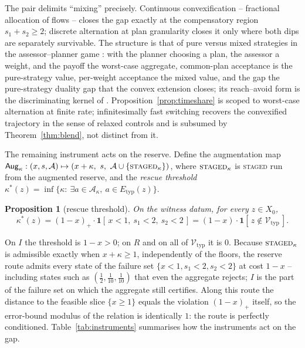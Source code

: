 \documentclass[preprint,11pt,authoryear]{elsarticle}
\newtheorem{proposition}{Proposition}
\theoremstyle{definition}
\theoremstyle{remark}
\newcommand{\Etyp}{E_{\mathrm{typ}}}
\newcommand{\Vtyp}{\mathcal{V}_{\mathrm{typ}}}
\newcommand{\act}[1]{\textsc{#1}}
\begin{document}
The pair delimits ``mixing'' precisely. Continuous convexification -- fractional allocation of flows -- closes the gap exactly at the compensatory region $s_1+s_2\ge2$; discrete alternation at plan granularity closes it only where both dips are separately survivable. The structure is that of pure versus mixed strategies in the assessor--planner game \citep{vonNeumann1928,Sion1958}: with the planner choosing a plan, the assessor a weight, and the payoff the worst-case aggregate, common-plan acceptance is the pure-strategy value, per-weight acceptance the mixed value, and the gap the pure-strategy duality gap that the convex extension closes; its reach--avoid form is the discriminating kernel of \citet{Cardaliaguet1996}. Proposition~\ref{prop:timeshare} is scoped to worst-case alternation at finite rate; infinitesimally fast switching recovers the convexified trajectory in the sense of relaxed controls \citep{Filippov1988,Warga1972} and is subsumed by Theorem~\ref{thm:blend}, not distinct from it.

The remaining instrument acts on the reserve. Define the augmentation map $\mathsf{Aug}_\kappa:(x,s,\mathcal A)\mapsto(x+\kappa,\ s,\ \mathcal A\cup\{\act{staged}_\kappa\})$, where $\act{staged}_\kappa$ is \act{staged} run from the augmented reserve, and the \emph{rescue threshold} $\kappa^*(z)=\inf\{\kappa:\ \exists a\in\mathcal A_\kappa,\ a\in\Etyp(z)\}$.

\begin{proposition}[rescue threshold]\label{prop:rescue}
On the witness datum, for every $z\in X_0$,
\[
\kappa^*(z)=(1-x)_+\cdot\mathbf 1[\,x<1,\ s_1<2,\ s_2<2\,]=(1-x)\cdot\mathbf 1[\,z\notin\Vtyp\,].
\]
\end{proposition}

On $I$ the threshold is $1-x>0$; on $R$ and on all of $\Vtyp$ it is $0$. Because $\act{staged}_\kappa$ is admissible exactly when $x+\kappa\ge1$, independently of the floors, the reserve route admits every state of the failure set $\{x<1,s_1<2,s_2<2\}$ at cost $1-x$ -- including states such as $(\tfrac12,\tfrac1{10},\tfrac1{10})$ that even the aggregate rejects; $I$ is the part of the failure set on which the aggregate still certifies. Along this route the distance to the feasible slice $\{x\ge1\}$ equals the violation $(1-x)_+$ itself, so the error-bound modulus \citep{Fabian2010} of the relation is identically $1$: the route is perfectly conditioned. Table~\ref{tab:instruments} summarises how the instruments act on the gap.
\end{document}
